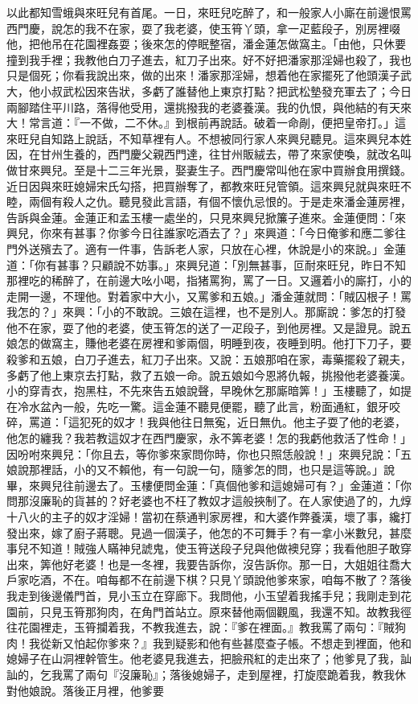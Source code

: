 \begin{showcontents}{}
以此都知雪蛾與來旺兒有首尾。一日，來旺兒吃醉了，和一般家人小廝在前邊恨罵西門慶，說怎的我不在家，耍了我老婆，使玉筲丫頭，拿一疋藍段子，別房裡啜他，把他吊在花園裡姦耍；後來怎的停眠整宿，潘金蓮怎做窩主。「由他，只休要撞到我手裡；我教他白刀子進去，紅刀子出來。好不好把潘家那淫婦也殺了，我也只是個死；你看我說出來，做的出來！潘家那淫婦，想着他在家擺死了他頭漢子武大，他小叔武松因來告狀，多虧了誰替他上東京打點？把武松墊發充軍去了；今日兩腳踏住平川路，落得他受用，還挑撥我的老婆養漢。我的仇恨，與他結的有天來大！常言道：『一不做，二不休。』到根前再說話。破着一命剮，便把皇帝打。」這來旺兒自知路上說話，不知草裡有人。不想被同行家人來興兒聽見。這來興兒本姓因，在甘州生養的，西門慶父親西門達，往甘州販絨去，帶了來家使喚，就改名叫做甘來興兒。至是十二三年光景，娶妻生子。西門慶常叫他在家中買辦食用撰錢。近日因與來旺媳婦宋氏勾搭，把買辦奪了，都教來旺兒管領。這來興兒就與來旺不睦，兩個有殺人之仇。聽見發此言語，有個不懷仇忌恨的。于是走來潘金蓮房裡，告訴與金蓮。金蓮正和孟玉樓一處坐的，只見來興兒掀簾子進來。金蓮便問：「來興兒，你來有甚事？你爹今日往誰家吃酒去了？」來興道：「今日俺爹和應二爹往門外送殯去了。適有一件事，告訴老人家，只放在心裡，休說是小的來說。」金蓮道：「你有甚事？只顧說不妨事。」來興兒道：「別無甚事，叵耐來旺兒，昨日不知那裡吃的稀醉了，在前邊大吆小喝，指猪罵狗，罵了一日。又邏着小的廝打，小的走開一邊，不理他。對着家中大小，又罵爹和五娘。」潘金蓮就問：「賊囚根子！罵我怎的？」來興：「小的不敢說。三娘在這裡，也不是別人。那廝說：爹怎的打發他不在家，耍了他的老婆，使玉筲怎的送了一疋段子，到他房裡。又是證見。說五娘怎的做窩主，賺他老婆在房裡和爹兩個，明睡到夜，夜睡到明。他打下刀子，要殺爹和五娘，白刀子進去，紅刀子出來。又說：五娘那咱在家，毒藥擺殺了親夫，多虧了他上東京去打點，救了五娘一命。說五娘如今恩將仇報，挑撥他老婆養漢。小的穿青衣，抱黑柱，不先來告五娘說聲，早晚休乞那廝暗筭！」玉樓聽了，如提在冷水盆內一般，先吃一驚。這金蓮不聽見便罷，聽了此言，粉面通紅，銀牙咬碎，罵道：「這犯死的奴才！我與他往日無寃，近日無仇。他主子耍了他的老婆，他怎的纏我？我若教這奴才在西門慶家，永不筭老婆！怎的我虧他救活了性命！」因吩咐來興兒：「你且去，等你爹來家問你時，你也只照恁般說！」來興兒說：「五娘說那裡話，小的又不賴他，有一句說一句，隨爹怎的問，也只是這等說。」說畢，來興兒往前邊去了。玉樓便問金蓮：「真個他爹和這媳婦可有？」金蓮道：「你問那沒廉恥的貨甚的？好老婆也不枉了教奴才這般挾制了。在人家使過了的，九焞十八火的主子的奴才淫婦！當初在蔡通判家房裡，和大婆作弊養漢，壞了事，纔打發出來，嫁了廚子蔣聰。見過一個漢子，他怎的不可舞手？有一拿小米數兒，甚麼事兒不知道！賊強人瞞神兒諕鬼，使玉筲送段子兒與他做襖兒穿；我看他胆子敢穿出來，筭他好老婆！也是一冬裡，我要告訴你，沒告訴你。那一日，大姐姐往喬大戶家吃酒，不在。咱每都不在前邊下棋？只見丫頭說他爹來家，咱每不散了？落後我走到後邊儀門首，見小玉立在穿廊下。我問他，小玉望着我搖手兒；我剛走到花園前，只見玉筲那狗肉，在角門首站立。原來替他兩個觀風，我還不知。故教我徑往花園裡走，玉筲攔着我，不教我進去，說：『爹在裡面。』教我罵了兩句：『賊狗肉！我從新又怕起你爹來？』我到疑影和他有些甚麼查子帳。不想走到裡面，他和媳婦子在山洞裡幹管生。他老婆見我進去，把臉飛紅的走出來了；他爹見了我，訕訕的，乞我罵了兩句『沒廉恥』；落後媳婦子，走到屋裡，打旋麼跪着我，教我休對他娘說。落後正月裡，他爹要
\end{showcontents}
